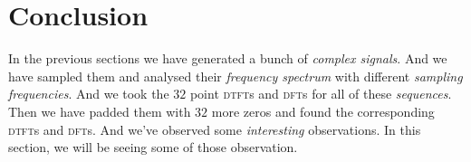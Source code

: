 \documentclass[../../course]{subfiles}
\begin{document}
\def\freqXOne{28}
\def\freqXTwo{56}
\def\freqXThree{56.1}

\def\sampFreqMuchLess{$f_{s} = \frac{4 \times 28}{2} = 56 \si{Hz}$}
\def\sampFreqNorm{$f_{s} = 4 \times 28 = 112 \si{Hz}$}
\def\sampFreqSligGreat{$122 \si{Hz}$}
\def\sampFreqMuchGreat{$f_{s} = 4 \times 28 \times 6 = 672 \si{Hz}$}

\def\sampFreqMuchLessJust{$56 \si{Hz}$}
\def\sampFreqNormJust{$112 \si{Hz}$}
\def\sampFreqSligGreatJust{$122 \si{Hz}$}
\def\sampFreqMuchGreatJust{$672 \si{Hz}$}

\pgfmathsetmacro{\endFreq}{((\freqXOne * 4) + 10)}

\section{Conclusion} \label{sec:conclusion}

In the previous sections we have generated a bunch of \emph{complex signals}. And
we have sampled them and analysed their \emph{frequency spectrum} with different
\emph{sampling frequencies}. And we took the $32$ point \textsc{dtft}s and
\textsc{dft}s for all of these \emph{sequences}. Then we have padded them with
$32$ more zeros and found the corresponding \textsc{dtft}s and \textsc{dft}s.
And we've observed some \emph{interesting} observations. In this section, we
will be seeing some of those observation.
\end{document}

